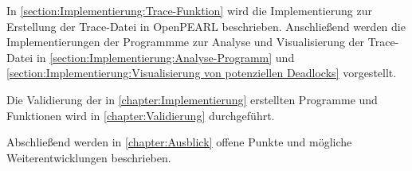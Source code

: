 In \cref{section:Implementierung:Trace-Funktion} wird die Implementierung zur
Erstellung der Trace-Datei in OpenPEARL beschrieben. Anschließend werden die
Implementierungen der Programmme zur Analyse und Visualisierung der Trace-Datei
in \cref{section:Implementierung:Analyse-Programm} und
\cref{section:Implementierung:Visualisierung von potenziellen Deadlocks}
vorgestellt.

Die Validierung der in \cref{chapter:Implementierung} erstellten Programme und
Funktionen wird in \cref{chapter:Validierung} durchgeführt.

Abschließend werden in \cref{chapter:Ausblick} offene Punkte und mögliche
Weiterentwicklungen beschrieben.